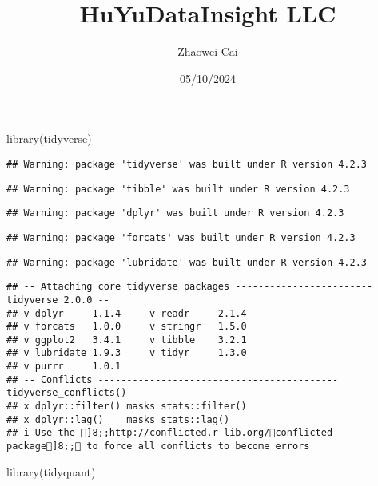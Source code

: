 \documentclass[
]{article}
\title{HuYuDataInsight LLC}
\author{Zhaowei Cai}
\date{05/10/2024}
\newenvironment{Shaded}{\begin{snugshade}}{\end{snugshade}}
\newcommand{\FunctionTok}[1]{\textcolor[rgb]{0.00,0.00,0.00}{#1}}
\newcommand{\NormalTok}[1]{#1}
\begin{document}
\maketitle

\begin{Shaded}
\begin{Highlighting}[]
\FunctionTok{library}\NormalTok{(tidyverse)}
\end{Highlighting}
\end{Shaded}

\begin{verbatim}
## Warning: package 'tidyverse' was built under R version 4.2.3
\end{verbatim}

\begin{verbatim}
## Warning: package 'tibble' was built under R version 4.2.3
\end{verbatim}

\begin{verbatim}
## Warning: package 'dplyr' was built under R version 4.2.3
\end{verbatim}

\begin{verbatim}
## Warning: package 'forcats' was built under R version 4.2.3
\end{verbatim}

\begin{verbatim}
## Warning: package 'lubridate' was built under R version 4.2.3
\end{verbatim}

\begin{verbatim}
## -- Attaching core tidyverse packages ------------------------ tidyverse 2.0.0 --
## v dplyr     1.1.4     v readr     2.1.4
## v forcats   1.0.0     v stringr   1.5.0
## v ggplot2   3.4.1     v tibble    3.2.1
## v lubridate 1.9.3     v tidyr     1.3.0
## v purrr     1.0.1     
## -- Conflicts ------------------------------------------ tidyverse_conflicts() --
## x dplyr::filter() masks stats::filter()
## x dplyr::lag()    masks stats::lag()
## i Use the ]8;;http://conflicted.r-lib.org/conflicted package]8;; to force all conflicts to become errors
\end{verbatim}

\begin{Shaded}
\begin{Highlighting}[]
\FunctionTok{library}\NormalTok{(tidyquant)}
\end{Highlighting}
\end{Shaded}
\end{document}
